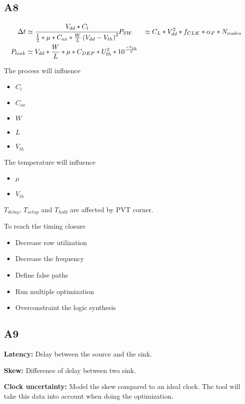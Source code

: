 \subsection{A8}

\begin{align}
  \Delta t &\simeq \cfrac{V_{dd} * C_l}{\frac{1}{2}*\mu*C_{ox} * \frac{W}{L}\left(V_{dd} - V_{th}\right)^2}
 P_{SW} &\simeq C_L * V_{dd}^2 * f_{CLK} * \alpha_F * N_{nodes}\\
 P_{leak}&\simeq V_{dd} * \frac{W}{L} * \mu * C_{DEP} * U_{th}^2 * 10^{\frac{-V_{th}}{S}}
\end{align}

The process will influence
\begin{itemize}
  \item \(C_l\)
  \item \(C_{ox}\)
  \item \(W\)
  \item \(L\)
  \item \(V_{th}\)
\end{itemize}

The temperature will influence
\begin{itemize}
  \item \(\mu\)
  \item \(V_{th}\)
\end{itemize}


\bigbreak
\(T_{delay}\), \(T_{setup}\) and \(T_{hold}\) are affected by PVT corner.

\bigbreak
To reach the timing closure
\begin{itemize}
  \item Decrease row utilization
  \item Decrease the frequency
  \item Define false paths
  \item Run multiple optimization
  \item Overconstraint the logic synthesis
\end{itemize}


\subsection{A9}

\textbf{Latency:} Delay between the source and the sink.

\textbf{Skew:} Difference of delay between two sink.

\textbf{Clock uncertainty:} Model the skew compared to an ideal clock. The tool will take this data into account when doing the optimization.

